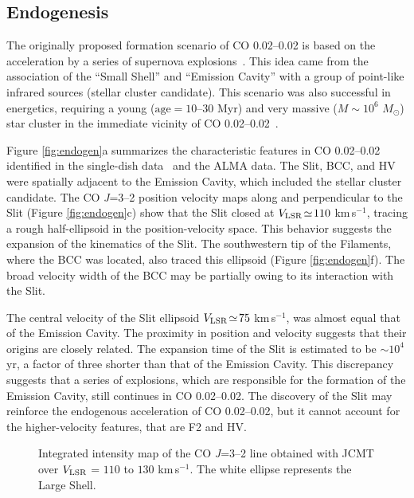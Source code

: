 \documentclass[twocolumn]{aastex631}
\newcommand\kms{\hbox{km$\,$s$^{-1}$}}
\newcommand\VLSR{\hbox{$V_{\rm LSR}$}}
\begin{document}
\subsection{Endogenesis}
The originally proposed formation scenario of CO 0.02--0.02 is based on the acceleration by a series of supernova explosions~\citep{Oka99, Oka08}.  This idea came from the association of the ``Small Shell'' and ``Emission Cavity'' with a group of point-like infrared sources (stellar cluster candidate). This scenario was also successful in energetics, requiring a young ($\mbox{age}\! =\! 10\mbox{--}30$ Myr) and very massive ($M\!\sim\! 10^{6}$ $M_{\odot}$) star cluster in the immediate vicinity of CO 0.02--0.02~\citep{Oka08}.   

Figure \ref{fig:endogen}a summarizes the characteristic features in CO 0.02--0.02 identified in the single-dish data~\citep{Oka99, Oka08} and the ALMA data. The Slit, BCC, and HV were spatially adjacent to the Emission Cavity, which included the stellar cluster candidate. The CO {\it J}=3--2 position velocity maps along and perpendicular to the Slit (Figure \ref{fig:endogen}c) show that the Slit closed at $\VLSR\!\simeq\! 110$ \kms , tracing a rough half-ellipsoid in the position-velocity space. This behavior suggests the expansion of the kinematics of the Slit. The southwestern tip of the Filaments, where the BCC was located, also traced this ellipsoid (Figure \ref{fig:endogen}f). The broad velocity width of the BCC may be partially owing to its interaction with the Slit.  

The central velocity of the Slit ellipsoid $\VLSR\!\simeq\! 75$ \kms , was almost equal that of the Emission Cavity. The proximity in position and velocity suggests that their origins are closely related. The expansion time of the Slit is estimated to be $\sim\! 10^{4}$ yr, a factor of three shorter than that of the Emission Cavity. This discrepancy suggests that a series of explosions, which are responsible for the formation of the Emission Cavity, still continues in CO 0.02--0.02. The discovery of the Slit may reinforce the endogenous acceleration of CO 0.02--0.02, but it cannot account for the higher-velocity features, that are F2 and HV.   

\begin{figure}[ht!]
\caption{Integrated intensity map of the CO {\it J}=3--2 line obtained with JCMT over $V_{\rm LSR}$ = $110$ to $130$ \kms. The white ellipse represents the Large Shell.
\label{fig:co32_shell}}
\end{figure}
\end{document}
